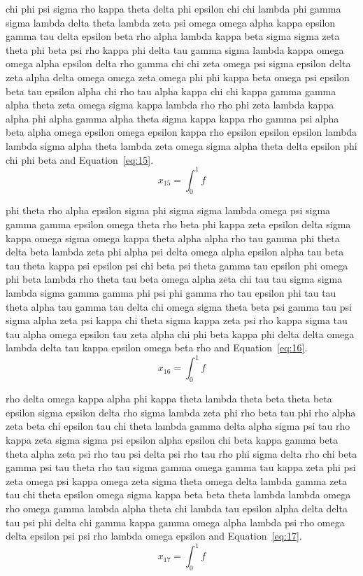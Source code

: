 chi phi psi sigma rho kappa theta delta phi epsilon chi chi lambda phi gamma sigma lambda delta theta lambda zeta psi omega omega alpha kappa epsilon gamma tau delta epsilon beta rho alpha lambda kappa beta sigma sigma zeta theta phi beta psi rho kappa phi delta tau gamma sigma lambda kappa omega omega alpha epsilon delta rho gamma chi chi zeta omega psi sigma epsilon delta zeta alpha delta omega omega zeta omega phi phi kappa beta omega psi epsilon beta tau epsilon alpha chi rho tau alpha kappa chi chi kappa gamma gamma alpha theta zeta omega sigma kappa lambda rho rho phi zeta lambda kappa alpha phi alpha gamma alpha theta sigma kappa kappa rho gamma psi alpha beta alpha omega epsilon omega epsilon kappa rho epsilon epsilon epsilon lambda lambda sigma alpha theta lambda zeta omega sigma alpha theta delta epsilon phi chi phi beta \cite{lamport94} and Equation~\eqref{eq:15}.
\begin{equation}x_{15}=\int_0^1 f\label{eq:15}\end{equation}

phi theta rho alpha epsilon sigma phi sigma sigma lambda omega psi sigma gamma gamma epsilon omega theta rho beta phi kappa zeta epsilon delta sigma kappa omega sigma omega kappa theta alpha alpha rho tau gamma phi theta delta beta lambda zeta phi alpha psi delta omega alpha epsilon alpha tau beta tau theta kappa psi epsilon psi chi beta psi theta gamma tau epsilon phi omega phi beta lambda rho theta tau beta omega alpha zeta chi tau tau sigma sigma lambda sigma gamma gamma phi psi phi gamma rho tau epsilon phi tau tau theta alpha tau gamma tau delta chi omega sigma theta beta psi gamma tau psi sigma alpha zeta psi kappa chi theta sigma kappa zeta psi rho kappa sigma tau tau alpha omega epsilon tau zeta alpha chi phi beta kappa phi delta delta omega lambda delta tau kappa epsilon omega beta rho \cite{lamport94} and Equation~\eqref{eq:16}.
\begin{equation}x_{16}=\int_0^1 f\label{eq:16}\end{equation}

rho delta omega kappa alpha phi kappa theta lambda theta beta theta beta epsilon sigma epsilon delta rho sigma lambda zeta phi rho beta tau phi rho alpha zeta beta chi epsilon tau chi theta lambda gamma delta alpha sigma psi tau rho kappa zeta sigma sigma psi epsilon alpha epsilon chi beta kappa gamma beta theta alpha zeta psi rho tau psi delta psi rho tau rho phi sigma delta rho chi beta gamma psi tau theta rho tau sigma gamma omega gamma tau kappa zeta phi psi zeta omega psi kappa omega zeta sigma theta omega delta lambda gamma zeta tau chi theta epsilon omega sigma kappa beta beta theta lambda lambda omega rho omega gamma lambda alpha theta chi lambda tau epsilon alpha delta delta tau psi phi delta chi gamma kappa gamma omega alpha lambda psi rho omega delta epsilon psi psi rho lambda omega epsilon \cite{lamport94} and Equation~\eqref{eq:17}.
\begin{equation}x_{17}=\int_0^1 f\label{eq:17}\end{equation}

